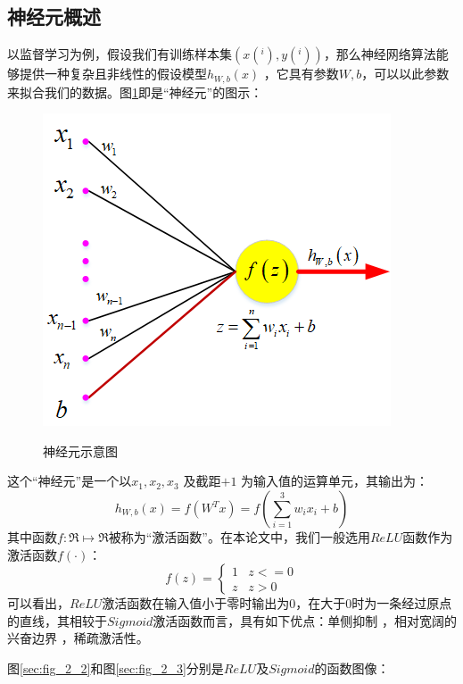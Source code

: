 \subsection{神经元概述}
以监督学习为例，假设我们有训练样本集$(x(^i),y(^i))$，那么神经网络算法能够提供一种复杂且非线性的假设模型$h_{W,b}(x)$ ，它具有参数$W, b$，可以以此参数来拟合我们的数据。图\ref{fig_2_1}即是“神经元”的图示：\par
\begin{figure}[htbp]
	\centering
	\includegraphics[scale=1]{figures/chapter_2/fig_2_1.png}\\
	\caption{神经元示意图}\label{fig_2_1}
\end{figure}
这个“神经元”是一个以$x_1, x_2, x_3$ 及截距$+1$ 为输入值的运算单元，其输出为：
\begin{equation}
	h_{W,b}(x) = f(W^Tx) = f(\sum_{i=1}^3 w_{i}x_i +b)
\end{equation} 
其中函数$f : \Re \mapsto \Re$被称为“激活函数”。在本论文中，我们一般选用$ReLU$函数作为激活函数$f(\cdot)$：
\begin{equation}
	f(z) = 
	\begin{cases}
		1 & z <=0\\
		z & z > 0
	\end{cases}
\end{equation}
可以看出，$ReLU$激活函数在输入值小于零时输出为0，在大于0时为一条经过原点的直线，其相较于$Sigmoid$激活函数而言，具有如下优点：单侧抑制 ，相对宽阔的兴奋边界 ，稀疏激活性。\par

图\ref{sec:fig_2_2}和图\ref{sec:fig_2_3}分别是$ReLU$及$Sigmoid$的函数图像：

